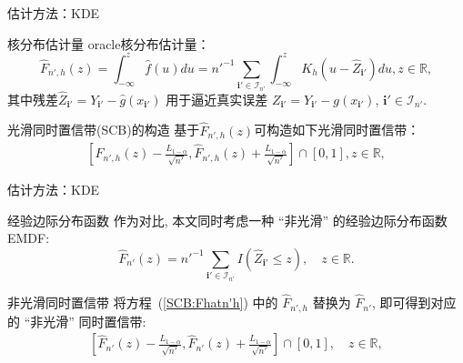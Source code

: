 \documentclass{beamer}
\begin{document}
\begin{frame}{估计方法：KDE}
\begin{block}{核分布估计量}
oracle核分布估计量：
\begin{equation}\label{EQ:FN'hhat-copy}
    \hat{F}_{n',h}(z) = \int_{-\infty}^{z}\hat{f}(u)du = n'^{-1}\sum_{\mathbf{i}'\in\mathcal{I}_{n'}}\int_{-\infty}^z K_h(u-\hat{Z}_{\mathbf{i}'})du,z\in\mathbb{R},
\end{equation}
其中残差$\hat{Z}_{\mathbf{i}'} = Y_{\mathbf{i}'} - \hat{g}(x_\mathbf{i'})$ 用于逼近真实误差 $Z_{\mathbf{i}'} = Y_{\mathbf{i}'} - g(x_\mathbf{i'})$, $\mathbf{i}'\in\mathcal{I}_{n'}$. 
\end{block}
\begin{block}{光滑同时置信带(SCB)的构造}
基于$\hat{F}_{n',h}(z)$可构造如下光滑同时置信带：
\begin{align} \label{SCB:Fhatn'h}
    \left[\hat{F}_{n',h}(z)-\frac{L_{1-\alpha}}{\sqrt{n'}}, \hat{F}_{n',h}(z)+\frac{L_{1-\alpha}}{\sqrt{n'}}\right] \cap [0,1], z \in \mathbb{R},
\end{align}
\end{block}
\end{frame}

\begin{frame}{估计方法：KDE}
\begin{block}{经验边际分布函数}
作为对比, 本文同时考虑一种 ``非光滑'' 的经验边际分布函数 EMDF:
\begin{equation} \label{EQ:Fn'hat}
    \hat{F}_{n'}(z) = n'^{-1}\sum_{\mathbf{i}'\in\mathcal{I}_{n'}} I(\hat{Z}_{\mathbf{i}'} \le z), \quad z \in \mathbb{R}.
\end{equation}
\end{block}
\begin{block}{非光滑同时置信带}
将方程~(\ref{SCB:Fhatn'h}) 中的 $\hat{F}_{n',h}$ 替换为 $\hat{F}_{n'}$, 即可得到对应的 ``非光滑'' 同时置信带:
\begin{align} \label{SCB:Fhatn'}
    \left[ \hat{F}_{n'}(z) - \frac{L_{1-\alpha}}{\sqrt{n'}},  \hat{F}_{n'}(z) + \frac{L_{1-\alpha}}{\sqrt{n'}} \right] \cap [0,1], \quad z \in \mathbb{R},
\end{align}

\end{block}
\end{frame}
\end{document}
